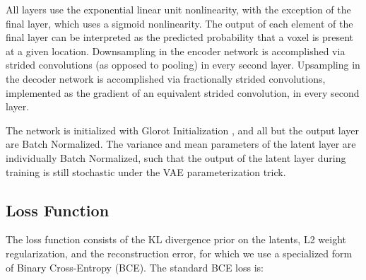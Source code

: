 \documentclass{article}
\begin{document}
All layers use the exponential linear unit \citep{ELU} nonlinearity, with the exception of the final layer, which uses a sigmoid nonlinearity. The output of each element of the final layer can be interpreted as the predicted probability that a voxel is present at a given location. 
Downsampling in the encoder network is accomplished via strided convolutions (as opposed to pooling) in every second layer. Upsampling in the decoder network is accomplished via fractionally strided convolutions, implemented as the gradient of an equivalent strided convolution\citep{arithmetic}, in every second layer.

The network is initialized with Glorot Initialization \citep{Glorot}, and all but the output layer are Batch Normalized\citep{Bnorm}. The variance and mean parameters of the latent layer are individually Batch Normalized, such that the output of the latent layer during training is still stochastic under the VAE parameterization trick. 

\subsection{Loss Function}
The loss function consists of the KL divergence prior on the latents, L2 weight regularization, and the reconstruction error, for which we use a specialized form of Binary Cross-Entropy (BCE).  The standard BCE loss is: 
\end{document}
